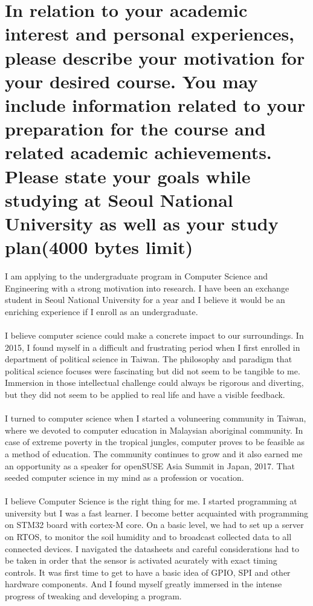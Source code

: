 \documentclass{article}
\begin{document}
\pagestyle{fancy}


\section{In relation to your academic interest and personal experiences, please describe your motivation for your desired course. You may include information related to your preparation for the course and related academic achievements. Please state your goals while studying at Seoul National University as well as your study plan(4000 bytes limit)}

I am applying to the undergraduate program in Computer Science and Engineering with a strong motivation into research. I have been an exchange student in Seoul National University for a year and I believe it would be an enriching experience if I enroll as an undergraduate.  \\
\\
I believe computer science could make a concrete impact to our surroundings.  
In 2015, I found myself in a difficult and frustrating period when I first enrolled in department of political science in Taiwan. The philosophy and paradigm that political science focuses were fascinating but did not seem to be tangible to me. Immersion in those intellectual challenge could always be rigorous and diverting, but they did not seem to be applied to real life and have a visible feedback.\\
\\
I turned to computer science when I started a voluneering community in Taiwan, where we devoted to computer education in Malaysian aboriginal community. In case of extreme poverty in the tropical jungles, computer proves to be feasible as a method of education. The community continues to grow and it also earned me an opportunity as a speaker for openSUSE Asia Summit in Japan, 2017. That seeded computer science in my mind as a profession or vocation.\\
\\
I believe Computer Science is the right thing for me. I started programming at university but I was a fast learner. I become better acquainted with programming on STM32 board with cortex-M core. On a basic level, we had to set up a server on RTOS, to monitor the soil humidity and to broadcast collected data to all connected devices. I navigated the datasheets and careful considerations had to be taken in order that the sensor is activated acurately with exact timing controls. It was first time to get to have a basic idea of GPIO, SPI and other hardware components. And I found myself greatly immersed in the intense progress of tweaking and developing a program. \\
\end{document}
